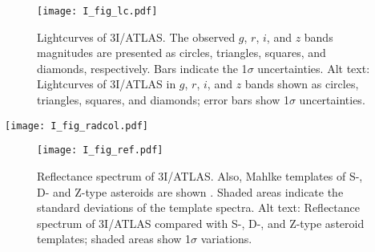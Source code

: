 \documentclass[]{pasj02}
\newcommand\I{3I/ATLAS\xspace}
\begin{document}
\begin{figure}
 \begin{center}
  \texttt{[image: I\_fig\_lc.pdf]} 
 \end{center}
\caption{
    Lightcurves of \I.
    The observed $g$, $r$, $i$, and $z$ bands magnitudes 
    are presented as circles, triangles, squares, and diamonds, respectively.
    Bars indicate the 1$\sigma$ uncertainties.
    {Alt text: Lightcurves of 3I/ATLAS in $g$, $r$, $i$, and $z$ bands shown as circles, triangles, squares, and diamonds; error bars show 1$\sigma$ uncertainties.} 
}\label{fig:lc}
\end{figure}

\begin{figure*}
 \begin{center}
  \texttt{[image: I\_fig\_radcol.pdf]} 
 \end{center}
\caption{
    Color indices of 3I/ATLAS ($g - r$, $r - i$, $r - z$) 
    as a function of aperture radius. 
    The median and standard deviation of the estimated colors are indicated by circles, while the nominal colors are marked with stars.
    Color indices remain nearly constant across aperture sizes from 5 to 12 pixels, indicating robustness of color measurement against aperture choice.
    {Alt text: 
    Color indices ($g - r$, $r - i$, $r - z$) of 3I/ATLAS vs. aperture radius. Circles indicate median values with standard deviation, stars indicate nominal values; colors remain stable from 5 to 12 pixels.} 
}\label{fig:radcol}
\end{figure*}


\begin{figure}
 \begin{center}
  \texttt{[image: I\_fig\_ref.pdf]} 
 \end{center}
\caption{
Reflectance spectrum of \I.
Also, Mahlke templates of S-, D- and Z-type asteroids are shown \citep{Mahlke2022}.
Shaded areas indicate the standard deviations of the template spectra. 
    {Alt text: Reflectance spectrum of 3I/ATLAS compared with S-, D-, and Z-type asteroid templates; shaded areas show 1$\sigma$ variations.} 
}\label{fig:ref}
\end{figure}
\end{document}
